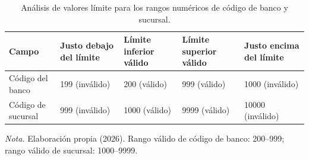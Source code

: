 \begin{table}[H]
  \centering
  \small
  \caption{Análisis de valores límite para los rangos numéricos de código de banco y sucursal.}
  \label{tab:pruebas_valores_limite}
  \begin{tabularx}{\linewidth}{|L{3.0cm}|Y|Y|Y|Y|}
    \hline
    \textbf{Campo} & \textbf{Justo debajo del límite} & \textbf{Límite inferior válido} & \textbf{Límite superior válido} & \textbf{Justo encima del límite} \\ \hline
    Código del banco & 199 (inválido) & 200 (válido) & 999 (válido) & 1000 (inválido) \\ \hline
    Código de sucursal & 999 (inválido) & 1000 (válido) & 9999 (válido) & 10000 (inválido) \\ \hline
  \end{tabularx}
  \par\vspace{0.2cm}
  {\raggedright \small \emph{Nota.} Elaboración propia (2026). Rango válido de código de banco: 200--999; rango válido de sucursal: 1000--9999.\par}
\end{table}

